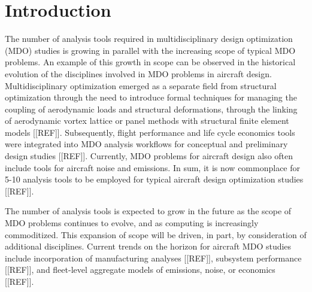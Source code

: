 \section{Introduction}
    
    The number of analysis tools required in multidisciplinary design optimization (MDO) studies is growing
    in parallel with the increasing scope of typical MDO problems. An example of this growth in scope can
    be observed in the historical evolution of the disciplines involved in MDO problems in aircraft design.
    Multidisciplinary optimization emerged as a separate field from structural optimization through the
    need to introduce formal techniques for managing the coupling of aerodynamic loads and structural
    deformations, through the linking of aerodynamic vortex lattice or panel methods with structural finite
    element models [[REF]]. Subsequently, flight performance and life cycle economics tools were integrated
    into MDO analysis workflows for conceptual and preliminary design studies [[REF]]. Currently, MDO
    problems for aircraft design also often include tools for aircraft noise and emissions. In sum, it is now
    commonplace for 5-10 analysis tools to be employed for typical aircraft design optimization studies [[REF]].
    
    The number of analysis tools is expected to grow in the future as the scope of MDO problems continues
    to evolve, and as computing is increasingly commoditized. This expansion of scope will be driven, in
    part, by consideration of additional disciplines. Current trends on the horizon for aircraft MDO studies
    include incorporation of manufacturing analyses [[REF]], subsystem performance [[REF]], and fleet-level
    aggregate models of emissions, noise, or economics [[REF]].

